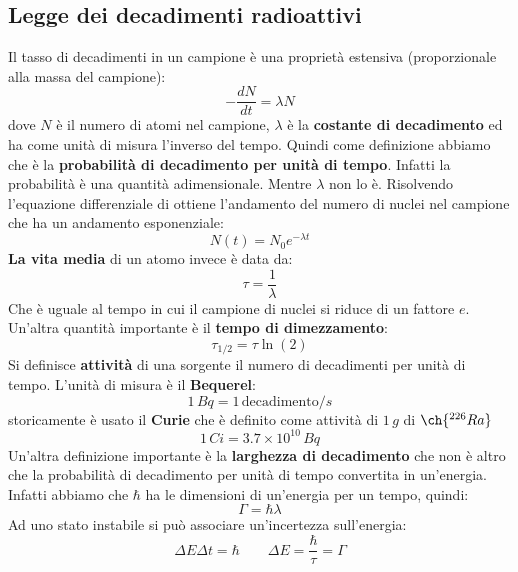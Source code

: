 \subsection{Legge dei decadimenti radioattivi}
Il tasso di decadimenti in un campione è una proprietà estensiva (proporzionale alla massa del campione):
\begin{equation*}
    -\frac{dN}{dt}=\lambda N
\end{equation*}
dove $N$ è  il numero di atomi nel campione, $\lambda$ è la \textbf{costante di decadimento} ed ha come unità di misura l'inverso del tempo. Quindi come definizione abbiamo che è la \textbf{probabilità di decadimento per unità di tempo}. Infatti la probabilità è una quantità adimensionale. Mentre $\lambda$ non lo è. Risolvendo l'equazione differenziale di ottiene l'andamento del numero di nuclei nel campione che ha un andamento esponenziale:
\begin{equation*}
    N(t)=N_0e^{-\lambda t}
\end{equation*}
\textbf{La vita media} di un atomo invece è data da:
\begin{equation*}
    \tau=\frac{1}{\lambda}
\end{equation*}
Che è uguale al tempo in cui il campione di nuclei si riduce di un fattore $e$. Un'altra quantità importante è il \textbf{tempo di dimezzamento}:
\begin{equation*}
    \tau_{1/2}=\tau\ln(2)
\end{equation*}
Si definisce \textbf{attività} di una sorgente il numero di decadimenti per unità di tempo. L'unità di misura è il \textbf{Bequerel}:
\begin{equation*}
    1\,Bq=1\,\text{decadimento}/s
\end{equation*}
storicamente è usato il \textbf{Curie} che è definito come attività di $1\,g$ di $\ch{^{226}Ra}$
\begin{equation*}
    1\,Ci=3.7\times10^{10}\,Bq
\end{equation*}
Un'altra definizione importante è la \textbf{larghezza di decadimento} che non è altro che la probabilità di decadimento per unità di tempo convertita in un'energia. Infatti abbiamo che $\hbar$ ha le dimensioni di un'energia per un tempo, quindi:
\begin{equation*}
    \Gamma=\hbar\lambda
\end{equation*}
Ad uno stato instabile si può associare un'incertezza sull'energia:
\begin{equation*}
    \Delta E\Delta t=\hbar \qquad \Delta E=\frac{\hbar}{\tau}=\Gamma
\end{equation*}
